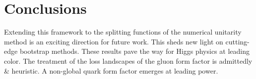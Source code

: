 \section{Conclusions}\label{sec:conclusions}

Extending this framework to the splitting functions of the numerical
unitarity method is an exciting direction for future work. This sheds
new light on cutting-edge bootstrap methods. These results pave the way
for Higgs physics at leading color. The treatment of the loss landscapes
of the gluon form factor is admittedly & heuristic. A non-global quark
form factor emerges at leading power.

